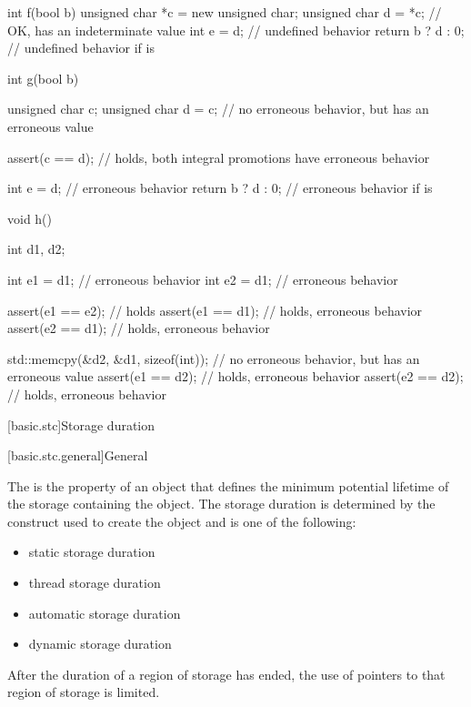 \begin{example}
\begin{codeblock}
int f(bool b) {
  unsigned char *c = new unsigned char;
  unsigned char d = *c;         // OK,  has an indeterminate value
  int e = d;                    // undefined behavior
  return b ? d : 0;             // undefined behavior if  is 
}

int g(bool b) {
  unsigned char c;
  unsigned char d = c;          // no erroneous behavior, but  has an erroneous value

  assert(c == d);               // holds, both integral promotions have erroneous behavior

  int e = d;                    // erroneous behavior
  return b ? d : 0;             // erroneous behavior if  is 
}

void h() {
  int d1, d2;

  int e1 = d1;                  // erroneous behavior
  int e2 = d1;                  // erroneous behavior

  assert(e1 == e2);             // holds
  assert(e1 == d1);             // holds, erroneous behavior
  assert(e2 == d1);             // holds, erroneous behavior

  std::memcpy(&d2, &d1, sizeof(int));   // no erroneous behavior, but  has an erroneous value
  assert(e1 == d2);             // holds, erroneous behavior
  assert(e2 == d2);             // holds, erroneous behavior
}
\end{codeblock}
\end{example}

[basic.stc]{Storage duration}

[basic.stc.general]{General}

\pnum
{}%
The  is the property of an object that defines the minimum
potential lifetime of the storage containing the object. The storage
duration is determined by the construct used to create the object and is
one of the following:
\begin{itemize}
\item static storage duration
\item thread storage duration
\item automatic storage duration
\item dynamic storage duration
\end{itemize}
\begin{note}
After the duration of a region of storage has ended,
the use of pointers to that region of storage is limited.
\end{note}

